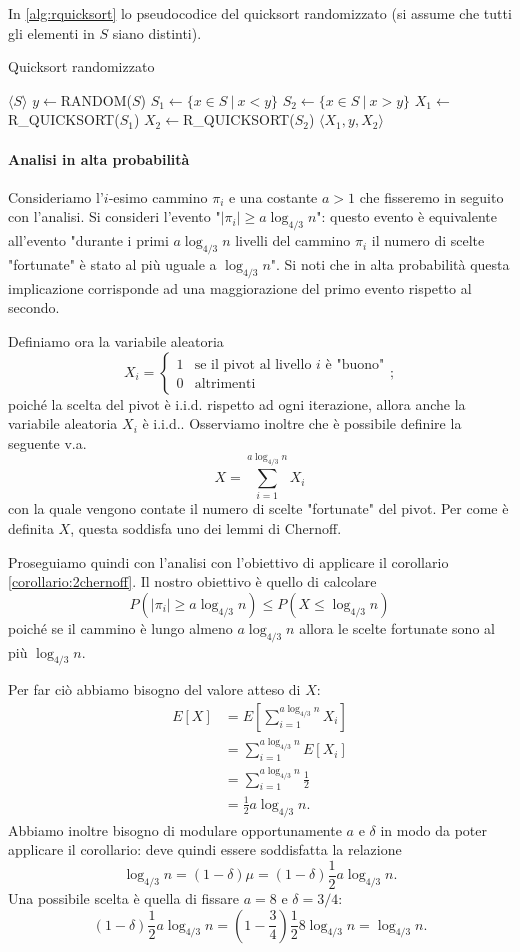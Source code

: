In \ref{alg:rquicksort} lo pseudocodice del quicksort randomizzato (si assume che tutti gli elementi in $S$ siano distinti).

\begin{algorithm}
\caption{Quicksort randomizzato}
\label{alg:rquicksort}
\begin{algorithmic}
		\State \Return $\langle S \rangle$
	\EndIf
	\State $y \gets $RANDOM($S$)
	\State $S_1 \gets \{x\in S\ |\ x<y\}$
	\State $S_2 \gets \{x\in S\ |\ x>y\}$
	\State $X_1 \gets $R\_QUICKSORT($S_1$)
	\State $X_2 \gets $R\_QUICKSORT($S_2$)
	\State \Return $\langle X_1,y,X_2 \rangle$
\EndFunction
\end{algorithmic}
\end{algorithm}

\paragraph{Analisi in alta probabilità} Consideriamo l'$i$-esimo cammino $\pi_i$ e una costante $a>1$ che fisseremo in seguito con l'analisi. Si consideri l'evento "$|\pi_i|\geq a\log_{4/3}n$": questo evento è equivalente all'evento "durante i primi $a\log_{4/3}n$ livelli del cammino $\pi_i$ il numero di scelte "fortunate" è stato al più uguale a $\log_{4/3}n$". Si noti che in alta probabilità questa implicazione corrisponde ad una maggiorazione del primo evento rispetto al secondo.

Definiamo ora la variabile aleatoria
\[
X_i=
\begin{cases}
1 & \text{se il pivot al livello } i \text{ è "buono"} \\
0 & \text{altrimenti}
\end{cases};
\]
poiché la scelta del pivot è i.i.d. rispetto ad ogni iterazione, allora anche la variabile aleatoria $X_i$ è i.i.d.. Osserviamo inoltre che è possibile definire la seguente v.a.
\[
X=\sum_{i=1}^{a\log_{4/3}n}X_i
\]
con la quale vengono contate il numero di scelte "fortunate" del pivot. Per come è definita $X$, questa soddisfa uno dei lemmi di Chernoff.

Proseguiamo quindi con l'analisi con l'obiettivo di applicare il corollario \ref{corollario:2chernoff}. Il nostro obiettivo è quello di calcolare
\[
P(|\pi_i|\geq a\log_{4/3}n)\leq P(X\leq \log_{4/3}n)
\]
poiché se il cammino è lungo almeno $a\log_{4/3}n$ allora le scelte fortunate sono al più $\log_{4/3}n$.

Per far ciò abbiamo bisogno del valore atteso di $X$:
\begin{align*}
E[X]&=E[\sum_{i=1}^{a\log_{4/3}n}X_i] \\
&=\sum_{i=1}^{a\log_{4/3}n}E[X_i] \\
&=\sum_{i=1}^{a\log_{4/3}n}\frac{1}{2} \\
&=\frac{1}{2}a\log_{4/3}n.
\end{align*}
Abbiamo inoltre bisogno di modulare opportunamente $a$ e $\delta$ in modo da poter applicare il corollario: deve quindi essere soddisfatta la relazione
\[
\log_{4/3}n=(1-\delta)\mu=(1-\delta)\frac{1}{2}a\log_{4/3}n.
\]
Una possibile scelta è quella di fissare $a=8$ e $\delta=3/4$:
\[
(1-\delta)\frac{1}{2}a\log_{4/3}n=\left(1-\frac{3}{4}\right)\frac{1}{2}8\log_{4/3}n=\log_{4/3}n.
\]

